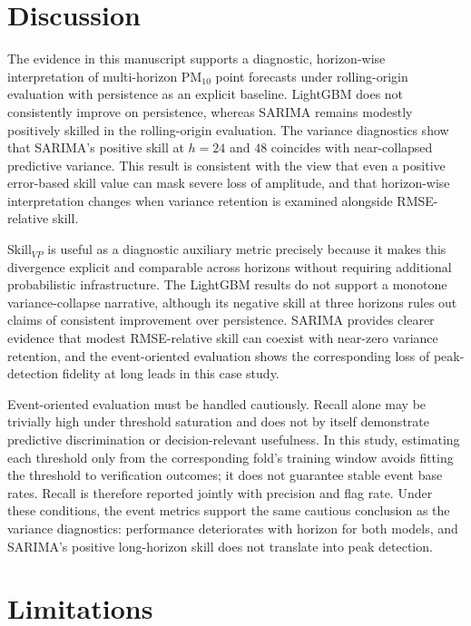 \documentclass{article}
\begin{document}
\section{Discussion}

The evidence in this manuscript supports a diagnostic, horizon-wise
interpretation of multi-horizon PM$_{10}$ point forecasts under rolling-origin
evaluation with persistence as an explicit baseline.
LightGBM does not consistently improve on persistence, whereas SARIMA remains
modestly positively skilled in the rolling-origin evaluation.  The variance
diagnostics show that SARIMA's positive skill at $h=24$ and $48$ coincides with
near-collapsed predictive variance.  This result is consistent with the view
that even a positive error-based skill value can mask severe loss of amplitude,
and that horizon-wise interpretation changes when variance retention is
examined alongside RMSE-relative skill.

Skill$_{VP}$ is useful as a diagnostic auxiliary metric precisely because it
makes this divergence explicit and comparable across horizons without requiring
additional probabilistic infrastructure.
The LightGBM results do not support a monotone variance-collapse narrative,
although its negative skill at three horizons rules out claims of consistent
improvement over persistence.  SARIMA provides clearer evidence that modest
RMSE-relative skill can coexist with near-zero variance retention, and the
event-oriented evaluation shows the corresponding loss of peak-detection
fidelity at long leads in this case study.

Event-oriented evaluation must be handled cautiously.
Recall alone may be trivially high under threshold saturation and does not by
itself demonstrate predictive discrimination or decision-relevant usefulness.
In this study, estimating each threshold only from the corresponding fold's
training window avoids fitting the threshold to verification outcomes; it does
not guarantee stable event base rates.  Recall is therefore reported jointly
with precision and flag rate.
Under these conditions, the event metrics support the same cautious conclusion
as the variance diagnostics: performance deteriorates with horizon for both
models, and SARIMA's positive long-horizon skill does not translate into peak
detection.

\section{Limitations}
\end{document}
